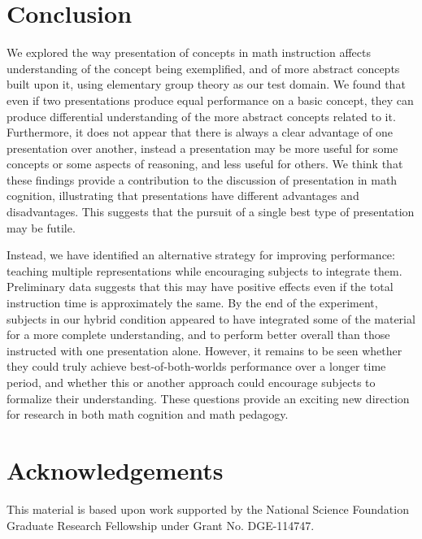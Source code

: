 \documentclass[man,10pt]{apa6}
\begin{document}
\section{Conclusion}
We explored the way presentation of concepts in math instruction affects understanding of the concept being exemplified, and of more abstract concepts built upon it, using elementary group theory as our test domain. We found that even if two presentations produce equal performance on a basic concept, they can produce differential understanding of the more abstract concepts related to it. Furthermore, it does not appear that there is always a clear advantage of one presentation over another, instead a presentation may be more useful for some concepts or some aspects of reasoning, and less useful for others. We think that these findings provide a contribution to the discussion of presentation in math cognition, illustrating that presentations have different advantages and disadvantages. This suggests that the pursuit of a single best type of presentation may be futile. \par
Instead, we have identified an alternative strategy for improving performance: teaching multiple representations while encouraging subjects to integrate them. Preliminary data suggests that this may have positive effects even if the total instruction time is approximately the same. By the end of the experiment, subjects in our hybrid condition appeared to have integrated some of the material for a more complete understanding, and to perform better overall than those instructed with one presentation alone. However, it remains to be seen whether they could truly achieve best-of-both-worlds performance over a longer time period, and whether this or another approach could encourage subjects to formalize their understanding. These questions provide an exciting new direction for research in both math cognition and math pedagogy.  
 
\section{Acknowledgements}
This material is based upon work supported by the National Science Foundation Graduate Research Fellowship under Grant No. DGE-114747.





\setcounter{secnumdepth}{-1}
\clearpage
\end{document}
